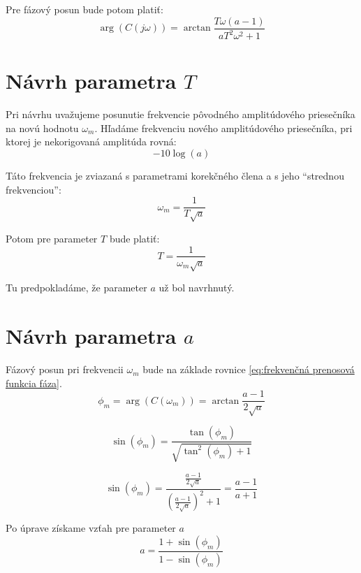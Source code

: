 \documentclass[a4paper,10pt]{article}
\begin{document}
Pre fázový posun bude potom platiť:
\begin{equation}
\label{eq:frekvenčná prenosová funkcia fáza}
 \arg(C(j\omega))=\arctan{\frac{T\omega(a-1)}{aT^2\omega^2+1}}
\end{equation}

\section{Návrh parametra $T$} 
Pri návrhu uvažujeme posunutie frekvencie pôvodného amplitúdového priesečníka na novú hodnotu $\omega_m$.
Hľadáme frekvenciu nového amplitúdového priesečníka, pri ktorej je nekorigovaná amplitúda rovná:
\begin{equation}
 -10\log(a)
\end{equation}

Táto frekvencia je zviazaná s parametrami korekčného člena a s jeho ``strednou frekvenciou'':
\begin{equation}
\omega_m=\frac{1}{T\sqrt{a}}
\end{equation}

Potom pre parameter $T$ bude platiť:
\begin{equation}
 T=\frac{1}{\omega_m\sqrt{a}}
\end{equation}

Tu predpokladáme, že parameter $a$ už bol navrhnutý.

\section{Návrh parametra $a$} 
Fázový posun pri frekvencii $\omega_m$ bude na základe rovnice \eqref{eq:frekvenčná prenosová funkcia fáza}.
\begin{equation}
 \phi_m=\arg(C(\omega_m))=\arctan{\frac{a-1}{2\sqrt{a}}}
\end{equation}

\begin{equation}
 \sin(\phi_m)=\frac{\tan(\phi_m)}{\sqrt{\tan^2(\phi_m)+1}}
\end{equation}

\begin{equation}
 \sin(\phi_m)=\frac{\frac{a-1}{2\sqrt{a}}}{\left({\frac{a-1}{2\sqrt{a}}}\right)^2+1}=\frac{a-1}{a+1}
\end{equation}

Po úprave získame vzťah pre parameter $a$
\begin{equation}
 a=\frac{1+\sin(\phi_m)}{1-\sin(\phi_m)}
\end{equation}
\end{document}
